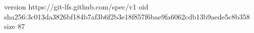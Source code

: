 version https://git-lfs.github.com/spec/v1
oid sha256:3c013da3826bf184b7af3b6f2b3e18f857f6bae9fa6062cdb13b9aede5c8b358
size 87
